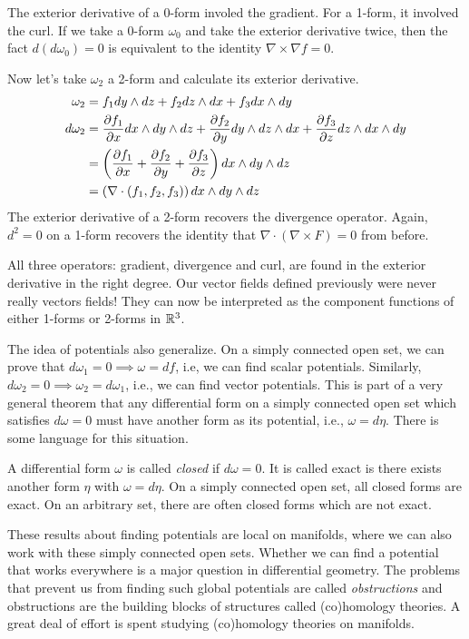\documentclass[fleqn,letterpaper]{report}
\begin{document}
The exterior derivative of a 0-form involed the gradient. For
a 1-form, it involved the curl. If we take a 0-form
$\omega_0$ and take the exterior derivative twice, then the
fact $d (d\omega_0) = 0$ is equivalent to the identity $\nabla
\times \nabla f = 0$.

Now let's take $\omega_2$ a 2-form and calculate its exterior
derivative.
\begin{align*}
\omega_2 & = f_1 dy\wedge dz + f_2 dz\wedge dx + f_3 dx \wedge dy \\
d \omega_2 & = \frac{\partial f_1}{\partial x} dx \wedge dy \wedge dz
+ \frac{\partial f_2}{\partial y} dy \wedge dz \wedge dx + \frac{\partial
f_3}{\partial z} dz \wedge dx \wedge dy \\
& = \left( \frac{\partial f_1}{\partial x} + \frac{\partial f_2}{\partial y} +
\frac{\partial f_3}{\partial z} \right) dx \wedge dy \wedge dz \\
& = \left( \nabla \cdot (f_1, f_2, f_3) \right) dx \wedge dy
\wedge dz
\end{align*}
The exterior derivative of a 2-form recovers the divergence
operator. Again, $d^2 = 0$ on a 1-form recovers the identity
that $\nabla \cdot (\nabla \times F) = 0$ from before.

All three operators: gradient, divergence and curl, are found
in the exterior derivative in the right degree. Our vector
fields defined previously were never really vectors fields!
They can now be interpreted as the component functions of
either 1-forms or 2-forms in $\mathbb{R}^3$.

The idea of potentials also generalize. On a simply connected
open set, we can prove that $d\omega_1 = 0 \implies \omega =
df$, i.e, we can find scalar potentials. Similarly,
$d\omega_2 = 0 \implies \omega_2 = d \omega_1$,
i.e., we can find vector potentials. This is part of a very
general theorem that any differential form on a simply
connected open set which satisfies $d \omega = 0$ must have
another form as its potential, i.e., $\omega = d \eta$. There
is some language for this situation.

\begin{defn}
A differential form $\omega$ is called \emph{closed} if $d
\omega = 0$. It is called exact is there exists another form
$\eta$ with $\omega = d\eta$. On a simply connected open set,
all closed forms are exact. On an arbitrary set, there are
often closed forms which are not exact.
\end{defn}

These results about finding potentials are local on manifolds,
where we can also work with these simply connected open sets.
Whether we can find a potential that works everywhere is a
major question in differential geometry. The problems that
prevent us from finding such global potentials are called
\emph{obstructions} and obstructions are the building blocks of
structures called (co)homology theories. A great deal of effort
is spent studying (co)homology theories on manifolds.
\end{document}

